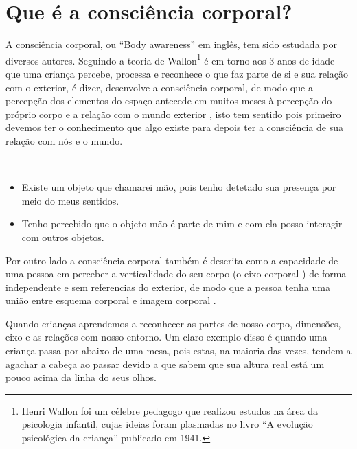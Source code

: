 \section{Que é a consciência corporal?}
\label{sec:BodyAwareness}
A consciência corporal, ou  ``Body awareness'' em inglês, 
tem sido estudada por diversos autores.
Seguindo a teoria de Wallon\footnote{Henri Wallon 
foi um célebre pedagogo que realizou estudos na área da psicologia infantil, 
cujas ideias foram plasmadas no livro ``A evolução psicológica da criança'' publicado em 1941.} 
é em torno aos 3 anos de idade que uma criança percebe, processa e reconhece
o que faz parte de si e sua relação com o exterior, é dizer, desenvolve a consciência corporal,
de modo que a percepção dos elementos do espaço antecede em muitos meses à 
percepção do próprio corpo e a relação com o mundo exterior
\cite{Garanhani2015} \cite{bueno2016psicomotricidade} \cite[pp. 154, 220]{wallon1968evoluccao}
\cite[pp. 14]{bolio2006fantasia},
isto tem sentido pois primeiro devemos ter o conhecimento que algo existe para 
depois ter a consciência de sua relação com nós e o mundo.
\begin{example}~

\begin{itemize}
\item Existe um objeto que chamarei mão, pois tenho detetado sua presença por meio do meus sentidos.
\item Tenho percebido que o objeto mão é parte de mim e com ela posso interagir com outros 
objetos. 
\end{itemize}
\end{example}
Por outro lado a consciência corporal também é descrita como a 
capacidade de uma pessoa em perceber a verticalidade do seu corpo 
(o eixo corporal \cite{bueno2016psicomotricidade}) de forma independente e 
sem referencias do exterior, 
de modo que a pessoa tenha uma união entre esquema corporal e imagem corporal \cite[pp. 14]{balcells2002expresion}.
\begin{example}
Quando crianças aprendemos a reconhecer as partes de nosso corpo, dimensões, eixo e as relações com nosso entorno.
Um claro exemplo disso é quando uma criança passa por abaixo de uma mesa, 
pois estas, na maioria das vezes, tendem a agachar a cabeça ao passar 
devido a que sabem que sua altura real está 
um pouco acima da linha do seus olhos.
\end{example}

